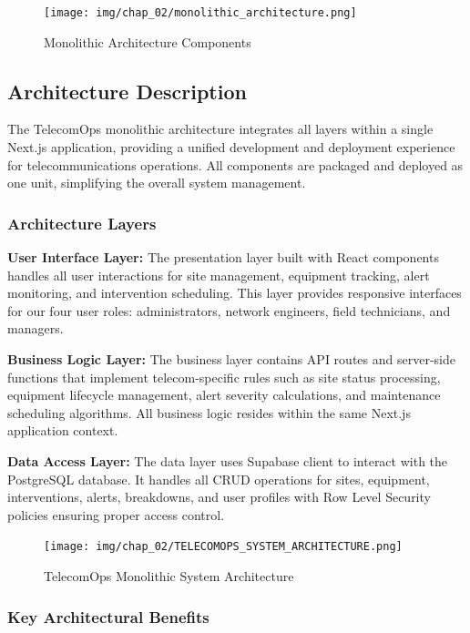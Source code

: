 \begin{figure}[hbt!]
    \centering
    \texttt{[image: img/chap\_02/monolithic\_architecture.png]}
    \caption{Monolithic Architecture Components}
    \label{fig:monolithic_architecture}
\end{figure}

\subsection{Architecture Description}
The TelecomOps monolithic architecture integrates all layers within a single Next.js application, providing a unified development and deployment experience for telecommunications operations. All components are packaged and deployed as one unit, simplifying the overall system management.

\subsubsection{Architecture Layers}

\textbf{User Interface Layer:}
The presentation layer built with React components handles all user interactions for site management, equipment tracking, alert monitoring, and intervention scheduling. This layer provides responsive interfaces for our four user roles: administrators, network engineers, field technicians, and managers.

\textbf{Business Logic Layer:}
The business layer contains API routes and server-side functions that implement telecom-specific rules such as site status processing, equipment lifecycle management, alert severity calculations, and maintenance scheduling algorithms. All business logic resides within the same Next.js application context.

\textbf{Data Access Layer:}
The data layer uses Supabase client to interact with the PostgreSQL database. It handles all CRUD operations for sites, equipment, interventions, alerts, breakdowns, and user profiles with Row Level Security policies ensuring proper access control.

\begin{figure}[hbt!]
    \centering
    \texttt{[image: img/chap\_02/TELECOMOPS\_SYSTEM\_ARCHITECTURE.png]}
    \caption{TelecomOps Monolithic System Architecture}
    \label{fig:system_architecture}
\end{figure}

\subsubsection{Key Architectural Benefits}

